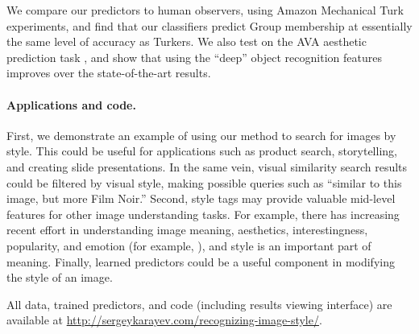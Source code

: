 We compare our predictors to human observers, using Amazon Mechanical Turk experiments, and find that our classifiers predict Group membership at essentially the same level of accuracy as Turkers.
We also test on the AVA aesthetic prediction task \cite{Murray-CVPR-2012}, and show that using the ``deep'' object recognition features improves over the state-of-the-art results.

\paragraph{Applications and code.}
First, we demonstrate an example of using our method to search for images by style.
This could be useful for applications such as product search, storytelling, and creating slide presentations.
In the same vein, visual similarity search results could be filtered by visual style, making possible queries such as ``similar to this image, but more Film Noir.''
Second, style tags may provide valuable mid-level features for other image understanding tasks.
For example, there has increasing recent effort in understanding image meaning, aesthetics, interestingness, popularity, and emotion (for example, \cite{Gygli-ICCV-2013,Isola-CVPR-2011,joo2014,khosla2014}), and style is an important part of meaning.
Finally, learned predictors could be a useful component in modifying the style of an image.

All data, trained predictors, and code (including results viewing interface) are available at \url{http://sergeykarayev.com/recognizing-image-style/}.
